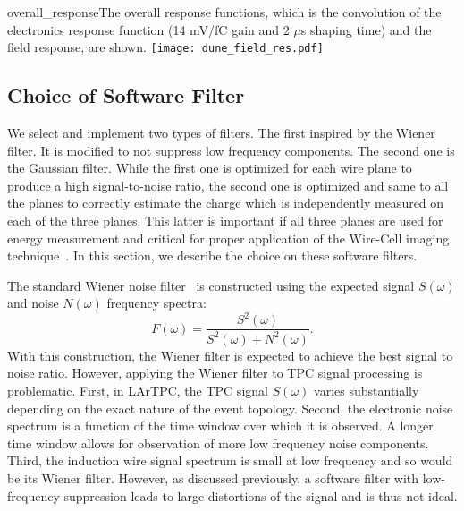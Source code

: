 \begin{cdrfigure}{overall_response}{The overall response functions, which is the convolution of the
electronics response function (14 mV/fC gain and 2 $\mu$s shaping time) 
and the field response, are shown.}
\texttt{[image: dune\_field\_res.pdf]}
\end{cdrfigure}



\subsection{Choice of Software Filter}

We select and implement two types of filters.  The first inspired by the Wiener filter.  
It is modified to not suppress low frequency components.  The second one is the 
Gaussian filter. While the first one is optimized for each wire plane to produce a 
high signal-to-noise ratio, the second one is optimized and same to all the planes 
to correctly estimate the charge which is independently measured on each of the three 
planes.  This latter is important if all three planes are used for energy measurement 
and critical for proper application of the Wire-Cell imaging technique~\cite{wire-cell}.  
In this section, we describe the choice on these software filters.

The standard Wiener noise filter~\cite{wiener} is constructed using the expected 
signal $S(\omega)$ and noise $N(\omega)$ frequency spectra:
\begin{equation}
F(\omega) = \frac{S^2(\omega)}{S^2(\omega) + N^2(\omega)}.
\end{equation}
With this construction, the Wiener filter is expected to achieve the best signal to noise ratio. 
However, applying the Wiener filter to TPC signal processing is problematic. 
First, in LArTPC, the TPC signal $S(\omega)$ varies substantially
depending on the exact nature of the event topology.
Second, the electronic noise spectrum is a function of the time window
over which it is observed. A longer time window allows for observation
of more low frequency noise components.
Third, the induction wire signal spectrum is small at low frequency
and so would be its Wiener filter.  However, as discussed previously, 
a software filter with low-frequency suppression leads to large distortions 
of the signal and is thus not ideal.  

